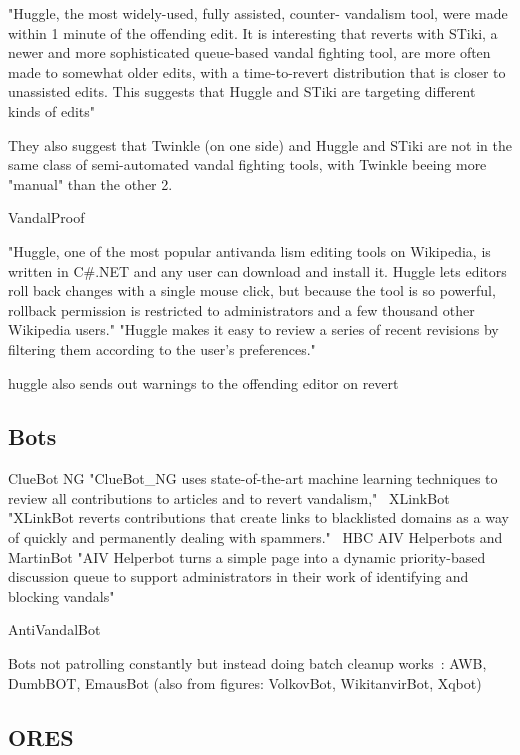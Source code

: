 \cite{GeiHal2013}
"Huggle, the most widely-used, fully assisted, counter-
vandalism tool, were made within 1 minute of the
offending edit. It is interesting that reverts with STiki, a
newer and more sophisticated queue-based vandal fighting
tool, are more often made to somewhat older edits, with a
time-to-revert distribution that is closer to unassisted edits.
This suggests that Huggle and STiki are targeting different
kinds of edits"

They also suggest that Twinkle (on one side) and Huggle and STiki are not in the same class of semi-automated vandal fighting tools, with Twinkle beeing more "manual" than the other 2.

VandalProof~\cite{HalRied2012}

"Huggle, one of the most popular
antivanda lism editing tools on
Wikipedia, is written in C#.NET
and any user can download and
install it. Huggle lets editors roll back
changes with a single mouse click,
but because the tool is so powerful,
rollback permission is restricted to
administrators and a few thousand
other Wikipedia users."
"Huggle makes it easy to review
a series of recent revisions by
filtering them according to the
user’s preferences."~\cite{HalRied2012}

huggle also sends out warnings to the offending editor on revert~\cite{HalRied2012}

\subsection{Bots}

ClueBot NG
"ClueBot_NG uses state-of-the-art machine learning techniques to review all contributions to
articles and to revert vandalism,"~\cite{HalRied2012}
XLinkBot
"XLinkBot reverts contributions that create links to
blacklisted domains as a way of quickly and permanently dealing with spammers."~\cite{HalRied2012}
HBC AIV Helperbots and MartinBot
"AIV Helperbot turns a simple page into a dynamic
priority-based discussion queue to support administrators in their work of identifying and
blocking vandals"~\cite{HalRied2012}

AntiVandalBot~\cite{HalRied2012}

Bots not patrolling constantly but instead doing batch cleanup works~\cite{GeiHal2013}:
AWB, DumbBOT, EmausBot
(also from figures: VolkovBot, WikitanvirBot, Xqbot)

\subsection{ORES}

